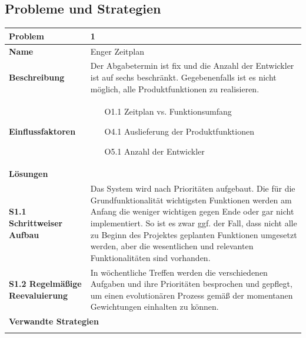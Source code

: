 \documentclass[fontsize=12pt,paper=a4,twoside]{scrartcl}
\begin{document}
\newpage
\subsection{Probleme und Strategien}
\label{sec:strategien}

\begin{tabularx}{\textwidth}{|l|X|}
 \hline
 \textbf{Problem} & 1 \\\hline
 \textbf{Name} & Enger Zeitplan \\\hline 
 \textbf{Beschreibung} & Der Abgabetermin ist fix und die Anzahl der Entwickler ist auf sechs beschränkt. Gegebenenfalls ist es nicht möglich, alle Produktfunktionen zu realisieren.\\\hline
 \textbf{Einflussfaktoren} &
 \begin{itemize}
 \item[O1.1] Zeitplan vs. Funktionsumfang
 \item[O4.1] Auslieferung der Produktfunktionen
 \item[O5.1] Anzahl der Entwickler
 \end{itemize}\\\hline
\multicolumn{2}{|l|}{\textbf{Lösungen}} \\\hline
\textbf{S1.1 Schrittweiser Aufbau} & Das System wird nach Prioritäten aufgebaut. Die für die Grundfunktionalität wichtigsten Funktionen werden am Anfang die weniger wichtigen gegen Ende oder gar nicht implementiert. So ist es zwar ggf. der Fall, dass nicht alle zu Beginn des Projektes geplanten Funktionen umgesetzt werden, aber die wesentlichen und relevanten Funktionalitäten sind vorhanden. \\

\textbf{S1.2 Regelmäßige Reevaluierung} & In wöchentliche Treffen werden die verschiedenen Aufgaben und ihre Prioritäten besprochen und gepflegt, um einen evolutionären Prozess gemäß der momentanen Gewichtungen einhalten zu können. \\\hline
 
 \multicolumn{2}{|l|}{\textbf{Verwandte Strategien}} \\\hline
  & \\\hline
\end{tabularx}
\end{document}
